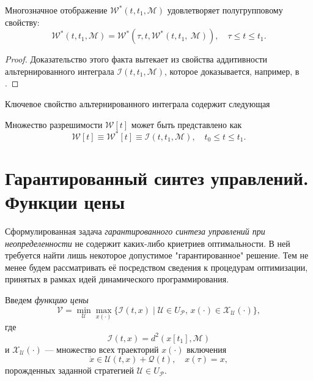 \begin{lemma}
    Многозначное отображение \( \mathcal{W}^*(t, t_1, \mathcal{M}) \) удовлетворяет полугрупповому
     свойству:
    \begin{equation}
        \mathcal{W}^*(t, t_1, \mathcal{M}) = \mathcal{W}^*(\tau, t, \mathcal{W}^*(t, t_1,\
         \mathcal{M})), \quad  \tau \le t \le t_1.
    \end{equation}
\end{lemma}
\begin{proof}
    Доказательство этого факта вытекает из свойства аддитивности альтернированного интеграла
     \( \mathcal{I}(t, t_1, \mathcal{M}) \), которое доказывается, например, в \cite{lin_dif_chasing}.
\end{proof}
Ключевое свойство альтернированного интеграла содержит следующая
\begin{theorem}
    Множество разрешимости \( \mathcal{W}[t] \) может быть представлено как 
    \begin{equation}
        \mathcal{W}[t] \equiv \mathcal{W}^*[t] \equiv \mathcal{I}(t, t_1, \mathcal{M}), \quad
         t_0 \le t \le t_1.
    \end{equation}
\end{theorem}

\section{Гарантированный синтез управлений. Функции цены}
Сформулированная задача \emph{гарантированного синтеза управлений при неопределенности} не содержит 
 каких-либо криетриев оптимальности. В ней требуется найти лишь некоторое допустимое "гарантированное"
 решение. Тем не менее будем рассматривать её посредством сведения к процедурам оптимизации, принятых
 в рамках идей динамического программирования.

Введем \emph{функцию цены} 
\begin{equation}
    \mathcal{V} = \min_{\mathcal{U}} \max_{x(\cdot)} \{\mathcal{I}(t,x) \mid \mathcal{U} \in 
     U_{\mathcal{P}}, \, x(\cdot) \in \mathcal{X}_{\mathcal{U}}(\cdot) \},
\end{equation}
где
\[
     \mathcal{I}(t,x) = d^2(x[t_1], \mathcal{M})
\]
и \( \mathcal{X}_{\mathcal{U}}(\cdot) \) --- множество всех траекторий \( x(\cdot) \) включения
\begin{equation}
    \dot{x} \in \mathcal{U}(t,x) + \mathcal{Q}(t), \quad x(\tau) = x,
\end{equation}
порожденных заданной стратегией \( \mathcal{U} \in U_{\mathcal{P}} \).

